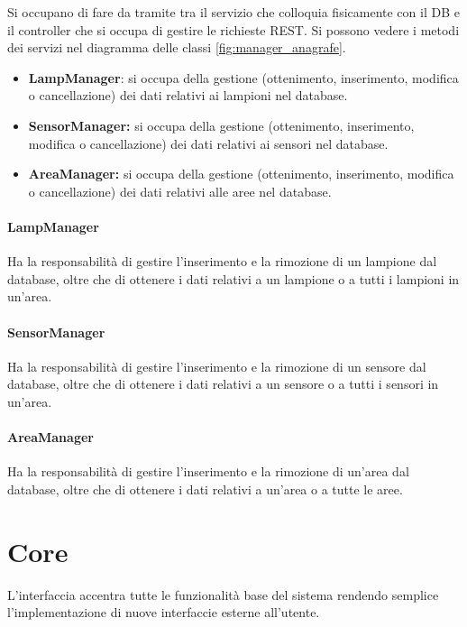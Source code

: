 Si occupano di fare da tramite tra il servizio che colloquia fisicamente con il DB e il controller che si occupa di gestire le richieste REST.
Si possono vedere i metodi dei servizi nel diagramma delle classi \ref{fig:manager_anagrafe}.

\begin{itemize}
    \item \textbf{LampManager}: si occupa della gestione (ottenimento, inserimento, modifica o cancellazione) dei dati relativi ai lampioni nel database.
    \item \textbf{SensorManager:} si occupa della gestione (ottenimento, inserimento, modifica o cancellazione) dei dati relativi ai sensori nel database. 
    \item \textbf{AreaManager:} si occupa della gestione (ottenimento, inserimento, modifica o cancellazione) dei dati relativi alle aree nel database.
\end{itemize}

\paragraph{LampManager}

Ha la responsabilità di gestire l'inserimento e la rimozione di un lampione dal database, oltre che di ottenere i dati relativi a un lampione o a tutti i lampioni in un'area.

\paragraph{SensorManager}

Ha la responsabilità di gestire l'inserimento e la rimozione di un sensore dal database, oltre che di ottenere i dati relativi a un sensore o a tutti i sensori in un'area.

\paragraph{AreaManager}
Ha la responsabilità di gestire l'inserimento e la rimozione di un'area dal database, oltre che di ottenere i dati relativi a un'area o a tutte le aree.

\section{Core}\label{sec:core} L'interfaccia accentra tutte le funzionalità base del sistema rendendo semplice l'implementazione di nuove interfaccie esterne all'utente.

